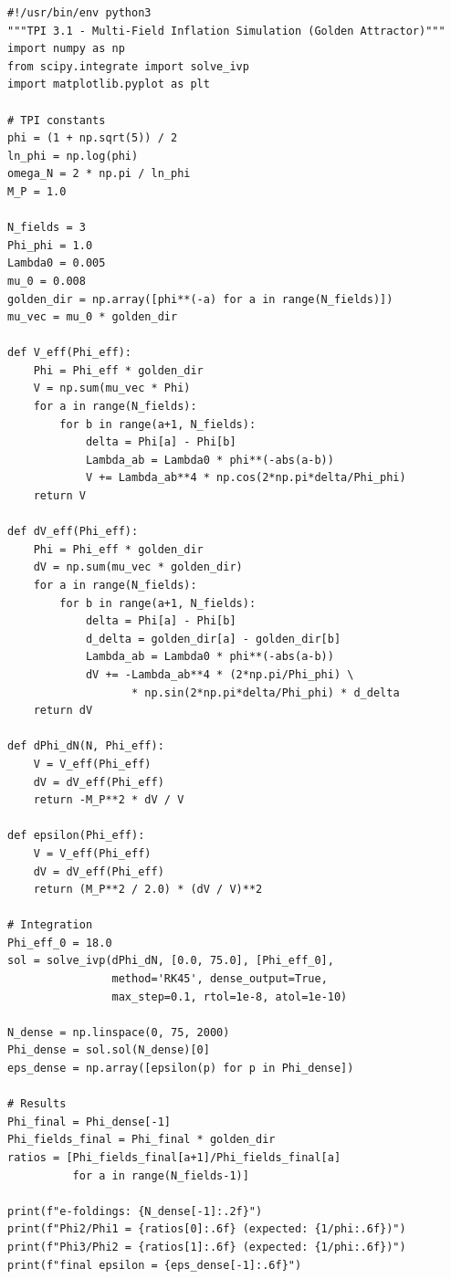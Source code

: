 \documentclass[11pt,a4paper]{article}
\theoremstyle{definition}
\begin{document}
\begin{lstlisting}
#!/usr/bin/env python3
"""TPI 3.1 - Multi-Field Inflation Simulation (Golden Attractor)"""
import numpy as np
from scipy.integrate import solve_ivp
import matplotlib.pyplot as plt

# TPI constants
phi = (1 + np.sqrt(5)) / 2
ln_phi = np.log(phi)
omega_N = 2 * np.pi / ln_phi
M_P = 1.0

N_fields = 3
Phi_phi = 1.0
Lambda0 = 0.005
mu_0 = 0.008
golden_dir = np.array([phi**(-a) for a in range(N_fields)])
mu_vec = mu_0 * golden_dir

def V_eff(Phi_eff):
    Phi = Phi_eff * golden_dir
    V = np.sum(mu_vec * Phi)
    for a in range(N_fields):
        for b in range(a+1, N_fields):
            delta = Phi[a] - Phi[b]
            Lambda_ab = Lambda0 * phi**(-abs(a-b))
            V += Lambda_ab**4 * np.cos(2*np.pi*delta/Phi_phi)
    return V

def dV_eff(Phi_eff):
    Phi = Phi_eff * golden_dir
    dV = np.sum(mu_vec * golden_dir)
    for a in range(N_fields):
        for b in range(a+1, N_fields):
            delta = Phi[a] - Phi[b]
            d_delta = golden_dir[a] - golden_dir[b]
            Lambda_ab = Lambda0 * phi**(-abs(a-b))
            dV += -Lambda_ab**4 * (2*np.pi/Phi_phi) \
                   * np.sin(2*np.pi*delta/Phi_phi) * d_delta
    return dV

def dPhi_dN(N, Phi_eff):
    V = V_eff(Phi_eff)
    dV = dV_eff(Phi_eff)
    return -M_P**2 * dV / V

def epsilon(Phi_eff):
    V = V_eff(Phi_eff)
    dV = dV_eff(Phi_eff)
    return (M_P**2 / 2.0) * (dV / V)**2

# Integration
Phi_eff_0 = 18.0
sol = solve_ivp(dPhi_dN, [0.0, 75.0], [Phi_eff_0],
                method='RK45', dense_output=True,
                max_step=0.1, rtol=1e-8, atol=1e-10)

N_dense = np.linspace(0, 75, 2000)
Phi_dense = sol.sol(N_dense)[0]
eps_dense = np.array([epsilon(p) for p in Phi_dense])

# Results
Phi_final = Phi_dense[-1]
Phi_fields_final = Phi_final * golden_dir
ratios = [Phi_fields_final[a+1]/Phi_fields_final[a]
          for a in range(N_fields-1)]

print(f"e-foldings: {N_dense[-1]:.2f}")
print(f"Phi2/Phi1 = {ratios[0]:.6f} (expected: {1/phi:.6f})")
print(f"Phi3/Phi2 = {ratios[1]:.6f} (expected: {1/phi:.6f})")
print(f"final epsilon = {eps_dense[-1]:.6f}")
\end{lstlisting}
\end{document}
